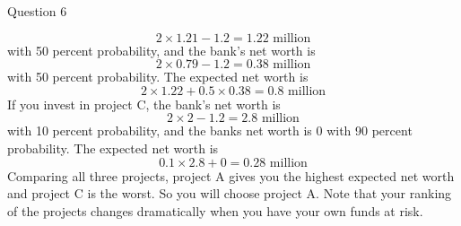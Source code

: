\documentclass[a4paper]{article}
\newif\IfInSansMode
\numberwithin{equation}{section}
\numberwithin{figure}{section}
\begin{document}
\begin{questionbox}{Question 6}
\begin{enumerate}[(a)]
\begin{explanationbox}
				\[
					2 \times 1.21 - 1.2 = 1.22 \text{ million}
				\]
				with 50 percent probability, and the bank's net worth is
				\[
					2 \times 0.79 - 1.2 = 0.38 \text{ million}
				\]
				with 50 percent probability. The expected net worth is
				\[
					2 \times 1.22 + 0.5 \times 0.38 = 0.8 \text{ million}
				\]
				If you invest in project C, the bank's net worth is
				\[
					2 \times 2 - 1.2 = 2.8 \text{ million}
				\]
				with 10 percent probability, and the banks net worth is 0 with 90 percent probability. The expected net worth is
				\[
					0.1 \times 2.8 + 0 = 0.28 \text{ million}
				\]
				Comparing all three projects, project A gives you the highest expected net worth and project C is the worst. So you will choose project A. Note that your ranking of the projects changes dramatically when you have your own funds at risk.
			\end{explanationbox}
		\end{enumerate}
	\end{questionbox}
\end{document}
